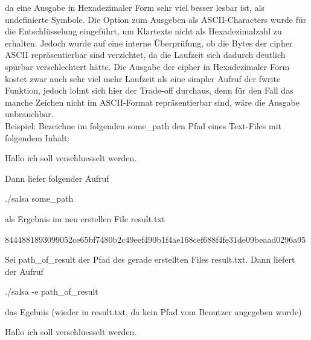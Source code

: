 \documentclass[course=erap]{aspdoc}
\begin{document}
 da eine Ausgabe in Hexadezimaler Form sehr viel besser lesbar ist, als undefinierte Symbole. Die Option zum Ausgeben als ASCII-Characters wurde für die Entschlüsselung eingeführt, um Klartexte nicht als Hexadezimalzahl zu erhalten. Jedoch wurde auf eine interne Überprüfung, ob die Bytes der cipher
ASCII repräsentierbar sind verzichtet, da die Laufzeit sich dadurch deutlich spürbar verschlechtert hätte. Die Ausgabe der cipher in Hexadezimaler Form kostet zwar auch sehr viel mehr Laufzeit als eine simpler Aufruf der fwrite Funktion, jedoch lohnt sich hier der Trade-off durchaus, 
denn für den Fall das manche Zeichen nicht im ASCII-Format repräsentierbar sind, wäre die Ausgabe unbrauchbar.
\\Beispiel: Bezeichne im folgenden some\_path den Pfad eines Text-Files mit folgendem Inhalt:
\begin{center}
    Hallo ich soll verschluesselt werden.
\end{center}
Dann liefer folgender Aufruf
\begin{center}
    ./salsa some\_path
\end{center}
als Ergebnis im neu erstellen File result.txt
\begin{center}
    8444881893099052ce65bf7480b2c49eef490b1f4ae168cef688f4fe31de09beaad0296a95
\end{center}
Sei path\_of\_result der Pfad des gerade erstellten Files result.txt. Dann liefert der Aufruf
\begin{center}
    ./salsa -e path\_of\_result
\end{center}
das Egebnis (wieder in result.txt, da kein Pfad vom Benutzer angegeben wurde)
\begin{center}
    Hallo ich soll verschluesselt werden.
\end{center}
\end{document}
